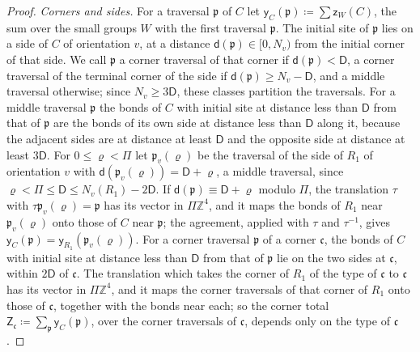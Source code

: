\documentclass[11pt]{preprint}
\numberwithin{equation}{section}
\theoremstyle{definition}
\theoremstyle{remark}
\theoremstyle{plain}
\begin{document}
\begin{proof}
\emph{Corners and sides.} For a traversal $\mathfrak p$ of $C$ let $\mathsf y_C(\mathfrak p) \coloneqq \sum\mathsf z_W(C)$, the sum over the small groups $W$ with the first traversal $\mathfrak p$. The initial site of $\mathfrak p$ lies on a side of $C$ of orientation $v$, at a distance $\mathsf d(\mathfrak p) \in [0, N_v)$ from the initial corner of that side. We call $\mathfrak p$ a corner traversal of that corner if $\mathsf d(\mathfrak p) < \mathsf D$, a corner traversal of the terminal corner of the side if $\mathsf d(\mathfrak p) \geq N_v - \mathsf D$, and a middle traversal otherwise; since $N_v \geq 3\mathsf D$, these classes partition the traversals. For a middle traversal $\mathfrak p$ the bonds of $C$ with initial site at distance less than $\mathsf D$ from that of $\mathfrak p$ are the bonds of its own side at distance less than $\mathsf D$ along it, because the adjacent sides are at distance at least $\mathsf D$ and the opposite side at distance at least $3\mathsf D$. For $0 \leq \varrho < \Pi$ let $\mathfrak p_v(\varrho)$ be the traversal of the side of $R_1$ of orientation $v$ with $\mathsf d(\mathfrak p_v(\varrho)) = \mathsf D + \varrho$, a middle traversal, since $\varrho < \Pi \leq \mathsf D \leq N_v(R_1) - 2\mathsf D$. If $\mathsf d(\mathfrak p) \equiv \mathsf D + \varrho$ modulo $\Pi$, the translation $\tau$ with $\tau\mathfrak p_v(\varrho) = \mathfrak p$ has its vector in $\Pi\mathbb Z^4$, and it maps the bonds of $R_1$ near $\mathfrak p_v(\varrho)$ onto those of $C$ near $\mathfrak p$; the agreement, applied with $\tau$ and $\tau^{-1}$, gives $\mathsf y_C(\mathfrak p) = \mathsf y_{R_1}(\mathfrak p_v(\varrho))$. For a corner traversal $\mathfrak p$ of a corner $\mathfrak c$, the bonds of $C$ with initial site at distance less than $\mathsf D$ from that of $\mathfrak p$ lie on the two sides at $\mathfrak c$, within $2\mathsf D$ of $\mathfrak c$. The translation which takes the corner of $R_1$ of the type of $\mathfrak c$ to $\mathfrak c$ has its vector in $\Pi\mathbb Z^4$, and it maps the corner traversals of that corner of $R_1$ onto those of $\mathfrak c$, together with the bonds near each; so the corner total $\mathsf Z_{\mathfrak c} \coloneqq \sum_{\mathfrak p}\mathsf y_C(\mathfrak p)$, over the corner traversals of $\mathfrak c$, depends only on the type of $\mathfrak c$.


\end{proof}
\end{document}
